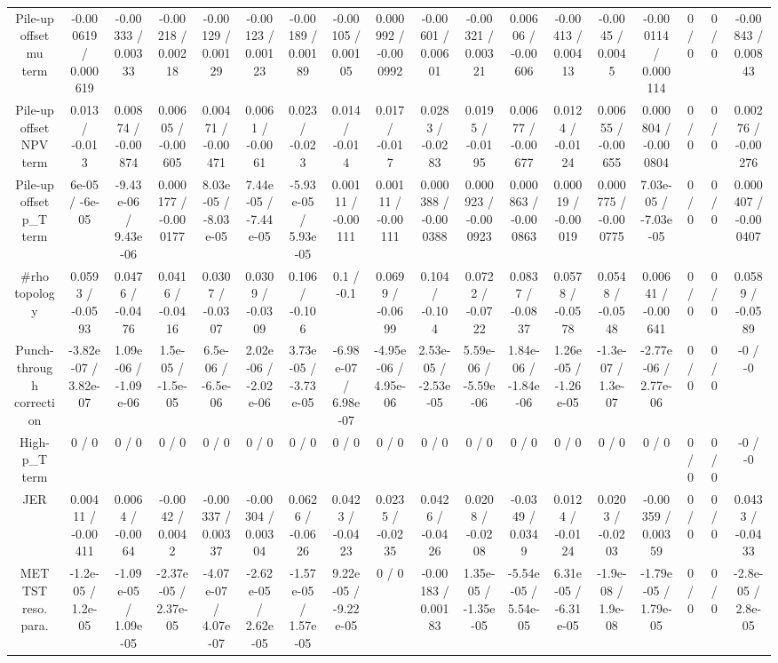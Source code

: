 \documentclass[10pt]{article}
\begin{document}
\begin{table}[htbp]
\begin{center}
\begin{tabular}{|c|c|c|c|c|c|c|c|c|c|c|c|c|c|c|c|c|c|}
  Pile-up offset mu term & -0.000619 / 0.000619 & -0.00333 / 0.00333 & -0.00218 / 0.00218 & -0.00129 / 0.00129 & -0.00123 / 0.00123 & -0.00189 / 0.00189 & -0.00105 / 0.00105 & 0.000992 / -0.000992 & -0.00601 / 0.00601 & -0.00321 / 0.00321 & 0.00606 / -0.00606 & -0.00413 / 0.00413 & -0.0045 / 0.0045 & -0.000114 / 0.000114 & 0 / 0 & 0 / 0 & -0.00843 / 0.00843 \\ 
  Pile-up offset NPV term & 0.013 / -0.013 & 0.00874 / -0.00874 & 0.00605 / -0.00605 & 0.00471 / -0.00471 & 0.0061 / -0.0061 & 0.023 / -0.023 & 0.014 / -0.014 & 0.017 / -0.017 & 0.0283 / -0.0283 & 0.0195 / -0.0195 & 0.00677 / -0.00677 & 0.0124 / -0.0124 & 0.00655 / -0.00655 & 0.000804 / -0.000804 & 0 / 0 & 0 / 0 & 0.00276 / -0.00276 \\ 
  Pile-up offset p_{T} term & 6e-05 / -6e-05 & -9.43e-06 / 9.43e-06 & 0.000177 / -0.000177 & 8.03e-05 / -8.03e-05 & 7.44e-05 / -7.44e-05 & -5.93e-05 / 5.93e-05 & 0.00111 / -0.00111 & 0.00111 / -0.00111 & 0.000388 / -0.000388 & 0.000923 / -0.000923 & 0.000863 / -0.000863 & 0.00019 / -0.00019 & 0.000775 / -0.000775 & 7.03e-05 / -7.03e-05 & 0 / 0 & 0 / 0 & 0.000407 / -0.000407 \\ 
  #rho topology & 0.0593 / -0.0593 & 0.0476 / -0.0476 & 0.0416 / -0.0416 & 0.0307 / -0.0307 & 0.0309 / -0.0309 & 0.106 / -0.106 & 0.1 / -0.1 & 0.0699 / -0.0699 & 0.104 / -0.104 & 0.0722 / -0.0722 & 0.0837 / -0.0837 & 0.0578 / -0.0578 & 0.0548 / -0.0548 & 0.00641 / -0.00641 & 0 / 0 & 0 / 0 & 0.0589 / -0.0589 \\ 
  Punch-through correction & -3.82e-07 / 3.82e-07 & 1.09e-06 / -1.09e-06 & 1.5e-05 / -1.5e-05 & 6.5e-06 / -6.5e-06 & 2.02e-06 / -2.02e-06 & 3.73e-05 / -3.73e-05 & -6.98e-07 / 6.98e-07 & -4.95e-06 / 4.95e-06 & 2.53e-05 / -2.53e-05 & 5.59e-06 / -5.59e-06 & 1.84e-06 / -1.84e-06 & 1.26e-05 / -1.26e-05 & -1.3e-07 / 1.3e-07 & -2.77e-06 / 2.77e-06 & 0 / 0 & 0 / 0 & -0 / -0 \\ 
  High-p_{T} term & 0 / 0 & 0 / 0 & 0 / 0 & 0 / 0 & 0 / 0 & 0 / 0 & 0 / 0 & 0 / 0 & 0 / 0 & 0 / 0 & 0 / 0 & 0 / 0 & 0 / 0 & 0 / 0 & 0 / 0 & 0 / 0 & -0 / -0 \\ 
  JER & 0.00411 / -0.00411 & 0.0064 / -0.0064 & -0.0042 / 0.0042 & -0.00337 / 0.00337 & -0.00304 / 0.00304 & 0.0626 / -0.0626 & 0.0423 / -0.0423 & 0.0235 / -0.0235 & 0.0426 / -0.0426 & 0.0208 / -0.0208 & -0.0349 / 0.0349 & 0.0124 / -0.0124 & 0.0203 / -0.0203 & -0.00359 / 0.00359 & 0 / 0 & 0 / 0 & 0.0433 / -0.0433 \\ 
  MET TST reso. para. & -1.2e-05 / 1.2e-05 & -1.09e-05 / 1.09e-05 & -2.37e-05 / 2.37e-05 & -4.07e-07 / 4.07e-07 & -2.62e-05 / 2.62e-05 & -1.57e-05 / 1.57e-05 & 9.22e-05 / -9.22e-05 & 0 / 0 & -0.00183 / 0.00183 & 1.35e-05 / -1.35e-05 & -5.54e-05 / 5.54e-05 & 6.31e-05 / -6.31e-05 & -1.9e-08 / 1.9e-08 & -1.79e-05 / 1.79e-05 & 0 / 0 & 0 / 0 & -2.8e-05 / 2.8e-05 \\ 

\end{tabular}
\end{center}
\end{table}
\end{document}
